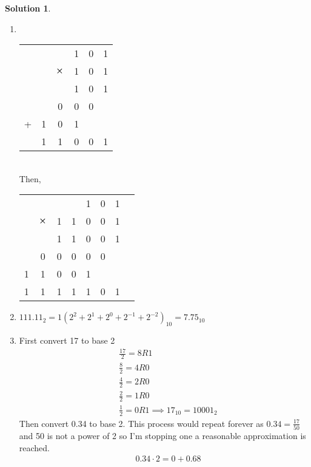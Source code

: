\documentclass[10pt]{article}
\theoremstyle{definition}
\newtheorem{soln}{Solution}
\begin{document}
\begin{soln}
\begin{enumerate}[label=(\alph*)]
    \item ~\\
          \begin{tabular}{cccccc}
            ~ & ~ & ~        & 1 & 0 & 1   \\
            ~ & ~ & $\cross$ & 1 & 0 & 1   \\
            \hline
            ~ & ~ & ~        & 1 & 0 & 1   \\
            ~ & ~ & 0        & 0 & 0 & ~   \\ 
            + & 1 & 0        & 1 & ~ & ~   \\ 
            \hline
            ~ & 1 & 1        & 0 & 0 & 1 
          \end{tabular} ~\\
          Then, \\
          \begin{tabular}{cccccccc}
            ~ & ~        & ~ & ~ & 1 & 0 & 1         \\
            ~ & $\cross$ & 1 & 1 & 0 & 0 & 1         \\
            \hline
            ~ & ~        & 1 & 1 & 0 & 0 & 1         \\
            ~ & 0        & 0 & 0 & 0 & 0             \\
            1 & 1        & 0 & 0 & 1                 \\ 
            \hline
            1 & 1        & 1 & 1 & 1 & 0 & 1       
          \end{tabular}
    \item $111.11_2=1\left(2^2+2^1+2^0+2^{-1}+2^{-2}\right)_{10}=7.75_{10}$
    \item First convert 17 to base 2
          \begin{align*}
             & \frac{17}{2}=8R1                           \\
             & \frac{8}{2}=4R0                            \\
             & \frac{4}{2}=2R0                            \\
             & \frac{2}{2}=1R0                            \\
             & \frac{1}{2}=0R1 \implies 17_{10}=10001_2 
          \end{align*}
          Then convert 0.34 to base 2. This process would repeat forever as $0.34=\frac{17}{50}$ and 50 is not a power of 2 so I'm stopping one a reasonable approximation is reached.
          \begin{align*}
             & 0.34\cdot 2 = 0+0.68                                       \\

\end{align*}
\end{enumerate}
\end{soln}
\end{document}
